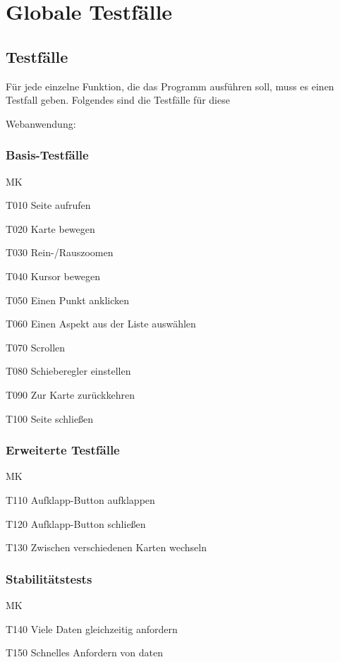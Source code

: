 \section{Globale Testfälle}
\subsection{Testfälle}
\setcounter{counter}{10}

Für jede einzelne Funktion, die das Programm ausführen soll, muss es einen Testfall geben. Folgendes sind die Testfälle für diese 

Webanwendung:
\subsubsection{Basis-Testfälle}
\begin{Kriterien}{MK}

	\item[T010] Seite aufrufen

	\item[T020] Karte bewegen
	
	
	\item[T030] Rein-/Rauszoomen
	
	\item[T040] Kursor bewegen
	
	\item[T050] Einen Punkt anklicken
	
	\item[T060] Einen Aspekt aus der Liste auswählen
	
	\item[T070] Scrollen
	
	\item[T080] Schieberegler einstellen
	
	\item[T090] Zur Karte zurückkehren
	
	\item[T100] Seite schließen
\end{Kriterien}
\subsubsection{Erweiterte Testfälle}
\begin{Kriterien}{MK}

	\item[T110] Aufklapp-Button aufklappen

	\item[T120]  Aufklapp-Button schließen
	
	\item[T130] Zwischen verschiedenen Karten wechseln
	
\end{Kriterien}
\subsubsection{Stabilitätstests}
\begin{Kriterien}{MK}

	\item[T140] Viele Daten gleichzeitig anfordern

	\item[T150] Schnelles Anfordern von daten
	
\end{Kriterien}

